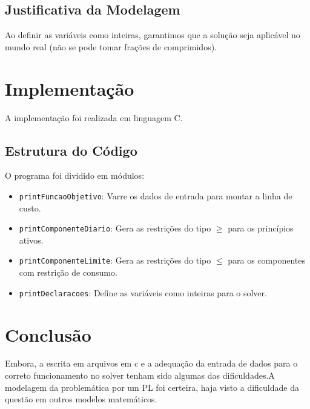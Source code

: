 \documentclass[12pt,a4paper]{article}
\begin{document}
\subsection{Justificativa da Modelagem}
 Ao definir as variáveis como inteiras, garantimos que a solução seja aplicável no mundo real (não se pode tomar frações de comprimidos).

\section{Implementação}
A implementação foi realizada em linguagem C.

\subsection{Estrutura do Código}
O programa foi dividido em módulos:
\begin{itemize}
    \item \texttt{printFuncaoObjetivo}: Varre os dados de entrada para montar a linha de custo.
    \item \texttt{printComponenteDiario}: Gera as restrições do tipo $\ge$ para os princípios ativos.
    \item \texttt{printComponenteLimite}: Gera as restrições do tipo $\le$ para os componentes com restrição de consumo.
    \item \texttt{printDeclaracoes}: Define as variáveis como inteiras para o solver.
\end{itemize}


\section{Conclusão}
Embora, a escrita em arquivos em c e a adequação da entrada de dados para o correto funcionamento no solver tenham sido algumas das dificuldades.A modelagem da problemática por um PL foi certeira, haja visto a dificuldade da questão em outros modelos matemáticos.
\end{document}
